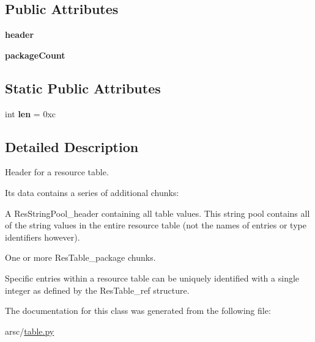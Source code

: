 \subsection*{Public Attributes}
\begin{DoxyCompactItemize}
\item 
\mbox{\label{classarsc_1_1table_1_1ResTable__header_a77eb36625af4e9b288c5e327dddd9977}} 
{\bfseries header}
\item 
\mbox{\label{classarsc_1_1table_1_1ResTable__header_a510f243bb891c3d365bddc56743e4142}} 
{\bfseries package\+Count}
\end{DoxyCompactItemize}
\subsection*{Static Public Attributes}
\begin{DoxyCompactItemize}
\item 
\mbox{\label{classarsc_1_1table_1_1ResTable__header_a9f602e710ec49a7f1541e21a7d81f1c9}} 
int {\bfseries len} = 0xc
\end{DoxyCompactItemize}


\subsection{Detailed Description}
Header for a resource table. 

Its data contains a series of additional chunks\+:
\begin{DoxyItemize}
\item A Res\+String\+Pool\+\_\+header containing all table values. This string pool contains all of the string values in the entire resource table (not the names of entries or type identifiers however).
\item One or more Res\+Table\+\_\+package chunks.
\end{DoxyItemize}

Specific entries within a resource table can be uniquely identified with a single integer as defined by the Res\+Table\+\_\+ref structure. 

The documentation for this class was generated from the following file\+:\begin{DoxyCompactItemize}
\item 
arsc/\mbox{\hyperlink{table_8py}{table.\+py}}\end{DoxyCompactItemize}
